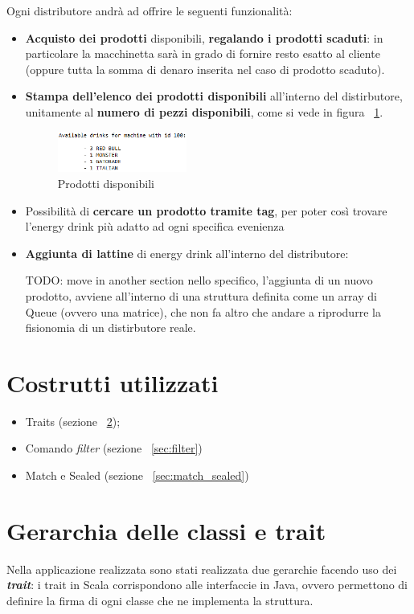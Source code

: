 Ogni distributore andrà ad offrire le seguenti funzionalità:
\begin{itemize}
	\item \textbf{Acquisto dei prodotti} disponibili, \textbf{regalando i prodotti scaduti}: in particolare la macchinetta sarà in grado di fornire resto esatto al cliente (oppure tutta la somma di denaro inserita nel caso di prodotto scaduto).
	\item \textbf{Stampa dell'elenco dei prodotti disponibili} all'interno del distirbutore, unitamente al \textbf{numero di pezzi disponibili}, come si vede in figura ~\ref{fig:AvailableProducts}.
	\begin{figure}[h]
		\centering
		\includegraphics[width=0.4\textwidth]{Immagini/ShowVendingMachine.png}
		\caption{Prodotti disponibili}
		\label{fig:AvailableProducts}
	\end{figure}
	\item Possibilità di \textbf{cercare un prodotto tramite tag}, per poter così trovare l'energy drink più adatto ad ogni specifica evenienza
	\item \textbf{Aggiunta di lattine} di energy drink all'interno del distributore: 
	
	
	TODO: move in another section nello specifico, l'aggiunta di un nuovo prodotto, avviene all'interno di una struttura definita come un array di Queue (ovvero una matrice), che non fa altro che andare a riprodurre la fisionomia di un distirbutore reale.
\end{itemize}

\section{Costrutti utilizzati}
\begin{itemize}
	\item Traits (sezione ~\ref{sec:traits});
	\item Comando \textit{filter} (sezione ~\ref{sec:filter})
	\item Match e Sealed (sezione ~\ref{sec:match_sealed})
\end{itemize}

\newpage
\section{Gerarchia delle classi e trait}
\label{sec:traits}
Nella applicazione realizzata sono stati realizzata due gerarchie facendo uso dei \textit{\textbf{trait}}: i trait in Scala corrispondono alle interfaccie in Java, ovvero permettono di definire la firma di ogni classe che ne implementa la struttura.

